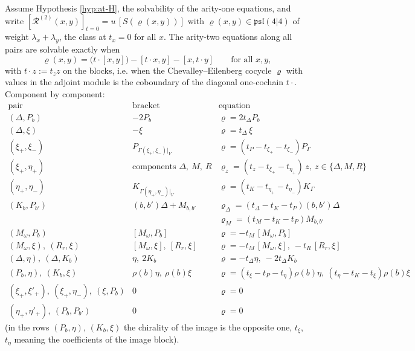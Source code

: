 \begin{theorem}
\label{thm:at-fix}
Assume Hypothesis \ref{hyp:at-H}, the solvability of the arity-one equations, and write $[\mathcal R^{(2)}(x,y)]_{t=0}=u\,[S(\varrho(x,y))]$ with $\varrho(x,y)\in\mathfrak{psl}(4|4)$ of weight $\lambda_x+\lambda_y$, the class at $t_x=0$ for all $x$. The arity-two equations along all pairs are solvable exactly when
\begin{equation}
\varrho(x,y)=\big(t\cdot[x,y]\big)-[t\cdot x,y]-[x,t\cdot y]\qquad\text{for all }x,y,
\label{eq:at-rho}
\end{equation}
with $t\cdot z:=t_zz$ on the blocks, i.e. when the Chevalley--Eilenberg cocycle $\varrho$ with values in the adjoint module is the coboundary of the diagonal one-cochain $t\cdot$. Component by component:
\[
\begin{array}{l|l|l}
\text{pair} & \text{bracket} & \text{equation}\\
\hline
(\Delta,P_b) & -2P_b & \varrho=2t_\Delta P_b\\
(\Delta,\xi) & -\xi & \varrho=t_\Delta\,\xi\\
(\xi_+,\xi_-) & P_{\Gamma(\xi_+,\xi_-)|_V} & \varrho=(t_P-t_{\xi_+}-t_{\xi_-})P_{\Gamma}\\
(\xi_+,\eta_+) & \text{components }\Delta,\ M,\ R & \varrho_z=(t_z-t_{\xi_+}-t_{\eta_+})\,z,\ z\in\{\Delta,M,R\}\\
(\eta_+,\eta_-) & K_{\Gamma(\eta_+,\eta_-)|_V} & \varrho=(t_K-t_{\eta_+}-t_{\eta_-})K_{\Gamma}\\
(K_b,P_{b'}) & (b,b')\Delta+M_{b,b'} & \varrho_\Delta=(t_\Delta-t_K-t_P)(b,b')\Delta\\
 & & \varrho_M=(t_M-t_K-t_P)M_{b,b'}\\
(M_\omega,P_b) & [M_\omega,P_b] & \varrho=-t_M\,[M_\omega,P_b]\\
(M_\omega,\xi),\ (R_r,\xi) & [M_\omega,\xi],\ [R_r,\xi] & \varrho=-t_M\,[M_\omega,\xi],\ -t_R\,[R_r,\xi]\\
(\Delta,\eta),\ (\Delta,K_b) & \eta,\ 2K_b & \varrho=-t_\Delta\eta,\ -2t_\Delta K_b\\
(P_b,\eta),\ (K_b,\xi) & \rho(b)\eta,\ \rho(b)\xi & \varrho=(t_{\xi}-t_P-t_{\eta})\rho(b)\eta,\ (t_\eta-t_K-t_\xi)\rho(b)\xi\\
(\xi_+,\xi'_+),\ (\xi_+,\eta_-),\ (\xi,P_b) & 0 & \varrho=0\\
(\eta_+,\eta'_+),\ (P_b,P_{b'}) & 0 & \varrho=0
\end{array}
\]
(in the rows $(P_b,\eta)$, $(K_b,\xi)$ the chirality of the image is the opposite one, $t_\xi$, $t_\eta$ meaning the coefficients of the image block).

\end{theorem}
